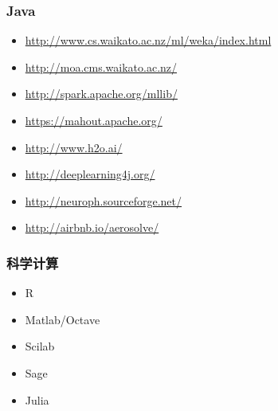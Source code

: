 \documentclass{beamer}
\begin{document}
\begin{frame}
\frametitle{Java}
\label{sec-7-4}

\begin{itemize}
\item \href{http://www.cs.waikato.ac.nz/ml/weka/index.html}{http://www.cs.waikato.ac.nz/ml/weka/index.html}
\item \href{http://moa.cms.waikato.ac.nz/}{http://moa.cms.waikato.ac.nz/}
\item \href{http://spark.apache.org/mllib/}{http://spark.apache.org/mllib/}
\item \href{https://mahout.apache.org/}{https://mahout.apache.org/}
\item \href{http://www.h2o.ai/}{http://www.h2o.ai/}
\item \href{http://deeplearning4j.org/}{http://deeplearning4j.org/}
\item \href{http://neuroph.sourceforge.net/}{http://neuroph.sourceforge.net/}
\item \href{http://airbnb.io/aerosolve/}{http://airbnb.io/aerosolve/}
\end{itemize}
\end{frame}
\begin{frame}
\frametitle{科学计算}
\label{sec-7-5}

\begin{itemize}
\item R
\item Matlab/Octave
\item Scilab
\item Sage
\item Julia
\end{itemize}
\end{frame}
\end{document}

